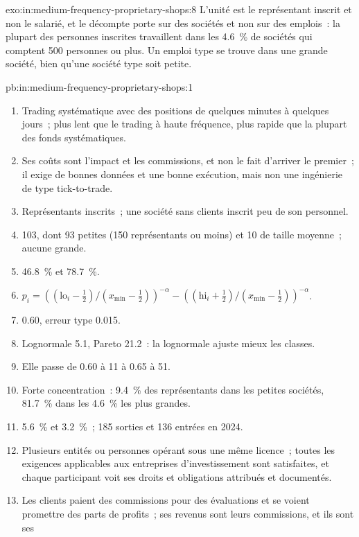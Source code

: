 \begin{solution}{exo:in:medium-frequency-proprietary-shops:8}
L'unité est le représentant inscrit et non le salarié, et le décompte porte sur des sociétés et non sur des emplois~: la plupart des personnes inscrites travaillent
dans les 4.6~\% de sociétés qui comptent 500 personnes ou plus. Un emploi type se trouve dans une grande société, bien qu'une société type soit petite.
\end{solution}

\begin{solution}{pb:in:medium-frequency-proprietary-shops:1}
\begin{enumerate}
\item Trading systématique avec des positions de quelques minutes à quelques jours~; plus lent que le trading à haute fréquence, plus rapide que la plupart des
fonds systématiques.
\item Ses coûts sont l'impact et les commissions, et non le fait d'arriver le premier~; il exige de bonnes données et une bonne exécution, mais non une ingénierie de type tick-to-trade.
\item Représentants inscrits~; une société sans clients inscrit peu de son personnel.
\item 103, dont 93 petites (150 représentants ou moins) et 10 de taille moyenne~; aucune grande.
\item 46.8~\% et 78.7~\%.
\item $p_i=((\mathrm{lo}_i-\tfrac12)/(x_{\min}-\tfrac12))^{-\alpha}-((\mathrm{hi}_i+\tfrac12)/(x_{\min}-\tfrac12))^{-\alpha}$.
\item $0.60$, erreur type 0.015.
\item Lognormale 5.1, Pareto 21.2~: la lognormale ajuste mieux les classes.
\item Elle passe de 0.60 à 11 à 0.65 à 51.
\item Forte concentration~: 9.4~\% des représentants dans les petites sociétés, 81.7~\% dans les 4.6~\% les plus grandes.
\item 5.6~\% et 3.2~\%~; 185 sorties et 136 entrées en 2024.
\item Plusieurs entités ou personnes opérant sous une même licence~; toutes les exigences applicables aux entreprises d'investissement sont satisfaites, et chaque
participant voit ses droits et obligations attribués et documentés.
\item Les clients paient des commissions pour des évaluations et se voient promettre des parts de profits~; ses revenus sont leurs commissions, et ils sont ses

\end{enumerate}
\end{solution}
